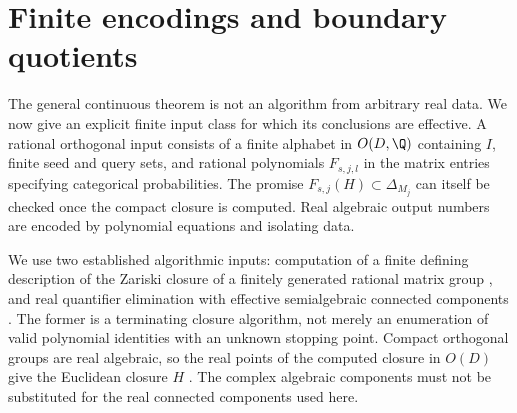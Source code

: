 \section{Finite encodings and boundary quotients}\label{sec:effective54}
The general continuous theorem is not an algorithm from arbitrary real data. We now give an explicit finite input class for which its conclusions are effective. A rational orthogonal input consists of a finite alphabet in $O(D,\Q)$ containing $I$, finite seed and query sets, and rational polynomials $F_{s,j,l}$ in the matrix entries specifying categorical probabilities. The promise $F_{s,j}(H)\subset\Delta_{M_j}$ can itself be checked once the compact closure is computed. Real algebraic output numbers are encoded by polynomial equations and isolating data.

We use two established algorithmic inputs: computation of a finite defining description of the Zariski closure of a finitely generated rational matrix group \cite{DJK,NPSW}, and real quantifier elimination with effective semialgebraic connected components \cite{BPR}. The former is a terminating closure algorithm, not merely an enumeration of valid polynomial identities with an unknown stopping point. Compact orthogonal groups are real algebraic, so the real points of the computed closure in $O(D)$ give the Euclidean closure $H$ \cite{BJKP}. The complex algebraic components must not be substituted for the real connected components used here.

